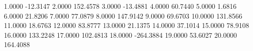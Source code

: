           1.0000          -12.3147  
          2.0000          152.4578  
          3.0000          -13.4881  
          4.0000           60.7440  
          5.0000            1.6816  
          6.0000           21.8206  
          7.0000           77.0879  
          8.0000          147.9142  
          9.0000           69.6703  
         10.0000          131.8566  
         11.0000           18.6763  
         12.0000           83.8777  
         13.0000           21.1375  
         14.0000           37.1014  
         15.0000           78.9108  
         16.0000          133.2248  
         17.0000          102.4813  
         18.0000          -264.3884  
         19.0000           53.6027  
         20.0000          164.4088  
